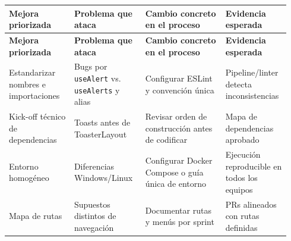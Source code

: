 \documentclass[11pt,a4paper]{article}
\begin{document}
\begingroup
\scriptsize
\setlength{\tabcolsep}{3pt}
\begin{longtable}{P{0.22\linewidth}P{0.24\linewidth}P{0.27\linewidth}P{0.21\linewidth}}
\toprule
\textbf{Mejora priorizada} & \textbf{Problema que ataca} & \textbf{Cambio concreto en el proceso} & \textbf{Evidencia esperada} \\
\midrule
\endfirsthead
\toprule
\textbf{Mejora priorizada} & \textbf{Problema que ataca} & \textbf{Cambio concreto en el proceso} & \textbf{Evidencia esperada} \\
\midrule
\endhead
\bottomrule
\endlastfoot
Estandarizar nombres e importaciones & Bugs por \texttt{useAlert} vs. \texttt{useAlerts} y alias & Configurar ESLint y convención única & Pipeline/linter detecta inconsistencias \\
Kick-off técnico de dependencias & Toasts antes de ToasterLayout & Revisar orden de construcción antes de codificar & Mapa de dependencias aprobado \\
Entorno homogéneo & Diferencias Windows/Linux & Configurar Docker Compose o guía única de entorno & Ejecución reproducible en todos los equipos \\
Mapa de rutas & Supuestos distintos de navegación & Documentar rutas y menús por sprint & PRs alineados con rutas definidas \\
\end{longtable}
\endgroup
\end{document}
